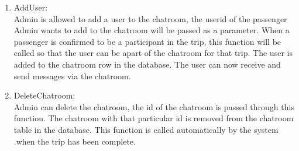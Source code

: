 \documentclass[hidelinks, 12pt, a4paper]{article}
\begin{document}
\begin{enumerate}[label=U1.\arabic*]
                \item AddUser:\\
                Admin is allowed to add a user to the chatroom, the userid of the passenger Admin wants to add to the chatroom will be passed as a parameter. When a passenger is confirmed to be a participant in the trip, this function will be called so that the user can be apart of the chatroom for that trip. The user is added to the chatroom row in the database. The user can now receive and send messages via the chatroom.\\

                \item DeleteChatroom:\\
                Admin can delete the chatroom, the id of the chatroom is passed through this function. The chatroom with that particular id is removed from the chatroom table in the database. This function is called automatically by the system .when the trip has been complete.\\
    \end{enumerate}

    
\end{document}

